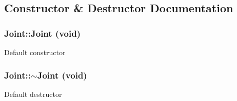 \subsection{Constructor \& Destructor Documentation}
\hypertarget{classCartWheel_1_1Physics_1_1Joint_ad391790cfe3d76bae3d7a78a4dd8f1c5}{
\subsubsection[{Joint}]{\setlength{\rightskip}{0pt plus 5cm}Joint::Joint (void)}}
\label{classCartWheel_1_1Physics_1_1Joint_ad391790cfe3d76bae3d7a78a4dd8f1c5}
Default constructor \hypertarget{classCartWheel_1_1Physics_1_1Joint_ac9749eeeac49e9861554f2d580cc020d}{
\subsubsection[{$\sim$Joint}]{\setlength{\rightskip}{0pt plus 5cm}Joint::$\sim$Joint (void)}}
\label{classCartWheel_1_1Physics_1_1Joint_ac9749eeeac49e9861554f2d580cc020d}
Default destructor 

